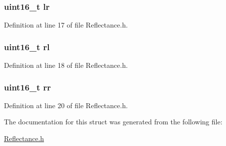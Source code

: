 \subsubsection[{\texorpdfstring{lr}{lr}}]{\setlength{\rightskip}{0pt plus 5cm}uint16\+\_\+t lr}\hypertarget{structsensors___af650f74b54fbe6d55c96161d2a7098ea}{}\label{structsensors___af650f74b54fbe6d55c96161d2a7098ea}


Definition at line 17 of file Reflectance.\+h.

\subsubsection[{\texorpdfstring{rl}{rl}}]{\setlength{\rightskip}{0pt plus 5cm}uint16\+\_\+t rl}\hypertarget{structsensors___a55f8b53aee5b41e8af88a816fab2b70b}{}\label{structsensors___a55f8b53aee5b41e8af88a816fab2b70b}


Definition at line 18 of file Reflectance.\+h.

\subsubsection[{\texorpdfstring{rr}{rr}}]{\setlength{\rightskip}{0pt plus 5cm}uint16\+\_\+t rr}\hypertarget{structsensors___a6988d1a89f109b3f8d0e06547a5362f6}{}\label{structsensors___a6988d1a89f109b3f8d0e06547a5362f6}


Definition at line 20 of file Reflectance.\+h.



The documentation for this struct was generated from the following file\+:\begin{DoxyCompactItemize}
\item 
\hyperlink{_reflectance_8h}{Reflectance.\+h}\end{DoxyCompactItemize}
